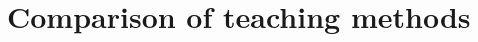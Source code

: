 \documentclass{amsart}
\begin{document}
%
%

\section{Comparison of teaching methods}
\end{document}
